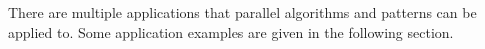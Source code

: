 There are multiple applications that parallel algorithms and patterns can be applied to.
Some application examples are given in the following section.